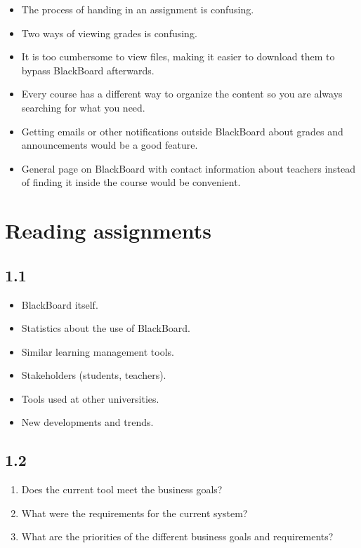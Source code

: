 \begin{itemize}
	\item The process of handing in an assignment is confusing.
	\item Two ways of viewing grades is confusing.
	\item It is too cumbersome to view files, making it easier to download them to bypass BlackBoard afterwards.
	\item Every course has a different way to organize the content so you are always searching for what you need.
	\item Getting emails or other notifications outside BlackBoard about grades and announcements would be a good feature.
	\item General page on BlackBoard with contact information about teachers instead of finding it inside the course would be convenient.
\end{itemize}


\chapter{Reading assignments}

\section*{1.1}

\begin{itemize}
	\item BlackBoard itself.
	\item Statistics about the use of BlackBoard.
	\item Similar learning management tools.
	\item Stakeholders (students, teachers).
	\item Tools used at other universities.
	\item New developments and trends.
\end{itemize}


\section*{1.2}

\begin{enumerate}
	\item Does the current tool meet the business goals?
	\item What were the requirements for the current system?
	\item What are the priorities of the different business goals and requirements?
\end{enumerate}




